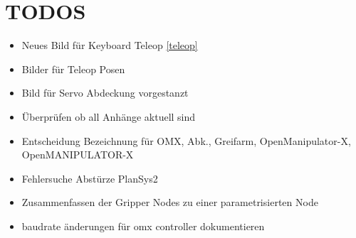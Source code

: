 \section{TODOS}
\begin{itemize}
\item Neues Bild für Keyboard Teleop \ref{teleop}
\item Bilder für Teleop Posen
\item Bild für Servo Abdeckung vorgestanzt
\item Überprüfen ob all Anhänge aktuell sind
\item Entscheidung Bezeichnung für OMX, Abk., Greifarm, OpenManipulator-X, OpenMANIPULATOR-X
\item Fehlersuche Abstürze PlanSys2
\item Zusammenfassen der Gripper Nodes zu einer parametrisierten Node
\item baudrate änderungen für omx controller dokumentieren
\end{itemize}